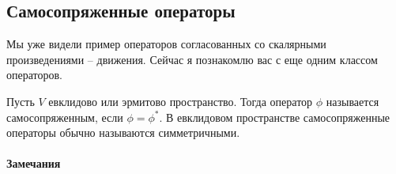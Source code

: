 \subsection{Самосопряженные операторы}

Мы уже видели пример операторов согласованных со скалярными произведениями -- движения.
Сейчас я познакомлю вас с еще одним классом операторов.

\begin{definition}
Пусть $V$ евклидово или эрмитово пространство.
Тогда оператор $\phi$ называется самосопряженным, если $\phi = \phi^*$.
В евклидовом пространстве самосопряженные операторы обычно называются симметричными.
\end{definition}

\paragraph{Замечания}

